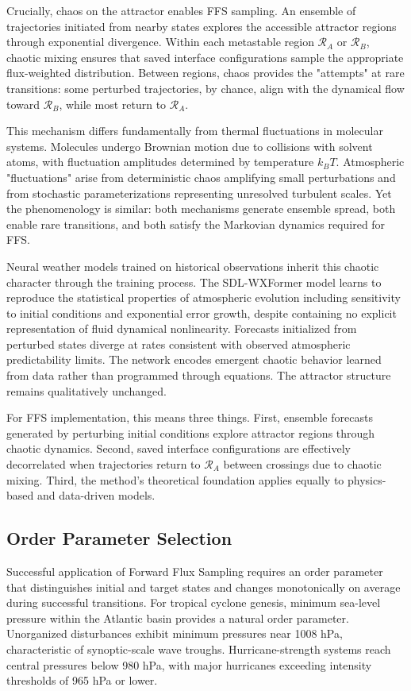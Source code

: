\documentclass[11pt]{article}
\begin{document}
Crucially, chaos on the attractor enables FFS sampling. An ensemble of trajectories initiated from nearby states explores the accessible attractor regions through exponential divergence. Within each metastable region $\mathcal{R}_A$ or $\mathcal{R}_B$, chaotic mixing ensures that saved interface configurations sample the appropriate flux-weighted distribution. Between regions, chaos provides the "attempts" at rare transitions: some perturbed trajectories, by chance, align with the dynamical flow toward $\mathcal{R}_B$, while most return to $\mathcal{R}_A$.

This mechanism differs fundamentally from thermal fluctuations in molecular systems. Molecules undergo Brownian motion due to collisions with solvent atoms, with fluctuation amplitudes determined by temperature $k_BT$. Atmospheric "fluctuations" arise from deterministic chaos amplifying small perturbations and from stochastic parameterizations representing unresolved turbulent scales. Yet the phenomenology is similar: both mechanisms generate ensemble spread, both enable rare transitions, and both satisfy the Markovian dynamics required for FFS.

Neural weather models trained on historical observations inherit this chaotic character through the training process. The SDL-WXFormer model learns to reproduce the statistical properties of atmospheric evolution including sensitivity to initial conditions and exponential error growth, despite containing no explicit representation of fluid dynamical nonlinearity. Forecasts initialized from perturbed states diverge at rates consistent with observed atmospheric predictability limits. The network encodes emergent chaotic behavior learned from data rather than programmed through equations. The attractor structure remains qualitatively unchanged.

For FFS implementation, this means three things. First, ensemble forecasts generated by perturbing initial conditions explore attractor regions through chaotic dynamics. Second, saved interface configurations are effectively decorrelated when trajectories return to $\mathcal{R}_A$ between crossings due to chaotic mixing. Third, the method's theoretical foundation applies equally to physics-based and data-driven models.

\subsection{Order Parameter Selection}

Successful application of Forward Flux Sampling requires an order parameter that distinguishes initial and target states and changes monotonically on average during successful transitions. For tropical cyclone genesis, minimum sea-level pressure within the Atlantic basin provides a natural order parameter. Unorganized disturbances exhibit minimum pressures near 1008 hPa, characteristic of synoptic-scale wave troughs. Hurricane-strength systems reach central pressures below 980 hPa, with major hurricanes exceeding intensity thresholds of 965 hPa or lower.
\end{document}
